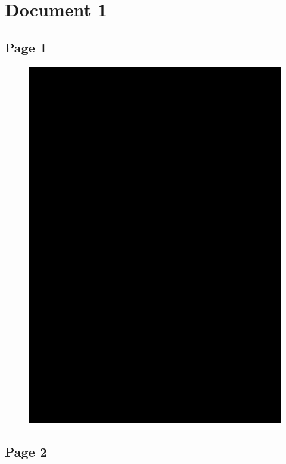 \section{Document 1}
\subsection{Page 1}

\newpage
\begin{figure}[H]
\centering
\includegraphics[page=2, width=0.9\linewidth]{doc/john/Document_1.pdf}
\end{figure}
\subsection{Page 2}

